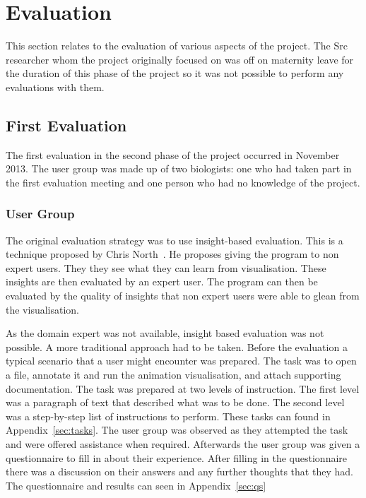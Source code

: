 \chapter{Evaluation}
\label{chap:eval}

This section relates to the evaluation of various aspects of the project.  The Src researcher whom the project originally focused on was off on maternity leave for the duration of this phase of the project so it was not possible to perform any evaluations with them.

\section{First Evaluation}

The first evaluation in the second phase of the project occurred in November 2013.  The user group was made up of two biologists:  one who had taken part in the first evaluation meeting and one person who had no knowledge of the project.

\subsection{User Group}

The original evaluation strategy was to use insight-based evaluation.  This is a technique proposed by Chris North~\cite{cn_vizbi}.  He proposes giving the program to non expert users.  They they see what they can learn from visualisation.  These insights are then evaluated by an expert user.  The program can then be evaluated by the quality of insights that non expert users were able to glean from the visualisation.

As the domain expert was not available, insight based evaluation was not possible.  A more traditional approach had to be taken.  Before the evaluation  a typical scenario that a user might encounter was prepared.  The task was to open a file, annotate it and run the animation visualisation, and attach supporting documentation.  The task was prepared at two levels of instruction.  The first level was a paragraph of text that described what was to be done.  The second level was a step-by-step list of instructions to perform.  These tasks can found in Appendix~\ref{sec:tasks}.  The user group was observed as they attempted the task and were offered assistance when required.  Afterwards the user group was given a questionnaire to fill in about their experience. After filling in the questionnaire there was a discussion on their answers and any further thoughts that they had.  The questionnaire and results can seen in Appendix~\ref{sec:qs}

